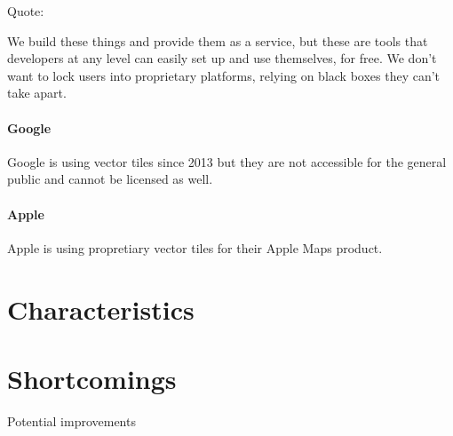 Quote:

We build these things and provide them as a service, but these are tools that developers at any level can easily set up and use themselves, for free. We don’t want to lock users into proprietary platforms, relying on black boxes they can’t take apart.

\paragraph{Google}

Google is using vector tiles since 2013 but they are not accessible for
the general public and cannot be licensed as well.

\paragraph{Apple}

Apple is using propretiary vector tiles for their Apple Maps product.

\section{Characteristics}

\section{Shortcomings}

Potential improvements